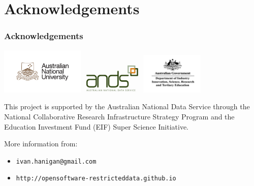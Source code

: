 \documentclass[bigger]{beamer}
\begin{document}
\section{Acknowledgements}
\label{sec-5}
\begin{frame}
\frametitle{Acknowledgements}
\label{sec-5-1}

\includegraphics[width=4cm]{ANU_LOGO_cmyk_56mm.png}
\includegraphics[width=3cm]{andslogo.pdf}
\includegraphics[width=3cm]{deptlogo.pdf} \\
\begin{footnotesize}
This project is supported by the Australian National Data Service through the National Collaborative Research Infrastructure Strategy Program and the Education Investment Fund (EIF) Super Science Initiative.

More information from:
\begin{itemize}
\item \texttt{ivan.hanigan@gmail.com}
\item \texttt{http://opensoftware-restricteddata.github.io}
\end{itemize}
\end{footnotesize}
\end{frame}
\end{document}
